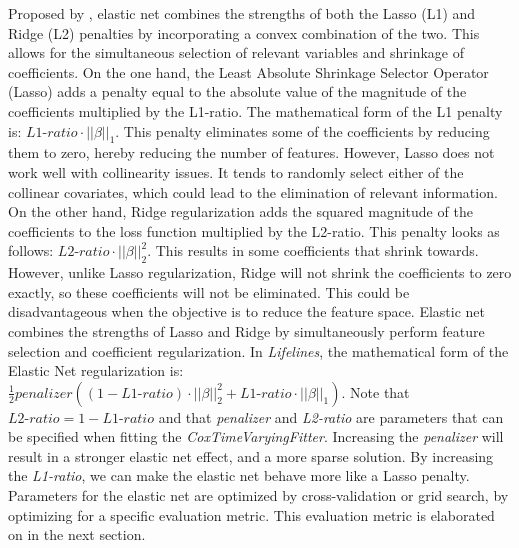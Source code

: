 Proposed by \cite{zou2005regularization}, elastic net combines the strengths of both the Lasso (L1) and Ridge (L2) penalties by incorporating a convex combination of the two. This allows for the simultaneous selection of relevant variables and shrinkage of coefficients. On the one hand, the Least Absolute Shrinkage Selector Operator (Lasso) adds a penalty equal to the absolute value of the magnitude of the coefficients multiplied by the L1-ratio. The mathematical form of the L1 penalty is: $\textit{L1-ratio} \cdot ||\beta||_1$. This penalty eliminates some of the coefficients by reducing them to zero, hereby reducing the number of features. However, Lasso does not work well with collinearity issues.  It tends to randomly select either of the collinear covariates, which could lead to the elimination of relevant information. On the other hand, Ridge regularization adds the squared magnitude of the coefficients to the loss function multiplied by the L2-ratio. This penalty looks as follows: $\textit{L2-ratio} \cdot ||\beta||^2_2$. This results in some coefficients that shrink towards. However, unlike Lasso regularization, Ridge will not shrink the coefficients to zero exactly, so these coefficients will not be eliminated. This could be disadvantageous when the objective is to reduce the feature space. Elastic net combines the strengths of Lasso and Ridge by simultaneously perform feature selection and coefficient regularization. In \textit{Lifelines}, the mathematical form of the Elastic Net regularization is: $\frac{1}{2}\textit{penalizer} ((1- \textit{L1-ratio}) \cdot ||\beta||^2_2 + \textit{L1-ratio} \cdot ||\beta||_1)$. Note that $\textit{L2-ratio} = 1 - \textit{L1-ratio}$ and that \textit{penalizer} and \textit{L2-ratio} are parameters that can be specified when fitting the \textit{CoxTimeVaryingFitter}. Increasing the \textit{penalizer} will result in a stronger elastic net effect, and a more sparse solution. By increasing the \textit{L1-ratio}, we can make the elastic net behave more like a Lasso penalty. Parameters for the elastic net are optimized by cross-validation or grid search, by optimizing for a specific evaluation metric. This evaluation metric is elaborated on in the next section. 

